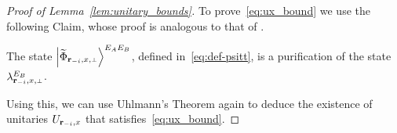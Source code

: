 \begin{proof}[Proof of Lemma~\ref{lem:unitary_bounds}]
To prove~\eqref{eq:ux_bound} we use the following Claim, whose proof is analogous to that of .
\begin{claim}
\label{clm:lambda-purification}
The state $\bigket{\wt{\Phi}_\ssxp}^{E_A E_B}$, defined in~\eqref{eq:def-psitt}, is a purification of the state $\lambda_\ssxp^{E_B}$. 
\end{claim}

Using this, we can use Uhlmann's Theorem again to deduce the existence of unitaries $U_{\mathbf{r}_{-i},x}$ that satisfies~\eqref{eq:ux_bound}. 

%
%


\end{proof}




